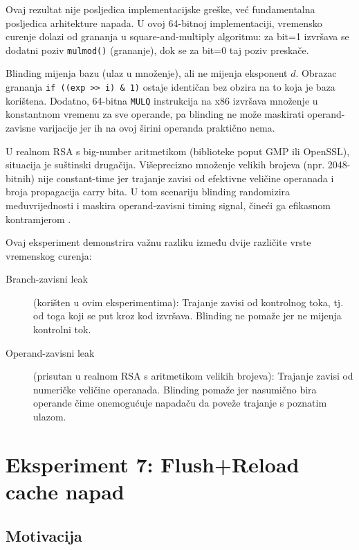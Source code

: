 Ovaj rezultat nije posljedica implementacijske greške, već fundamentalna posljedica arhitekture napada. U ovoj 64-bitnoj implementaciji, vremensko curenje dolazi od grananja u square-and-multiply algoritmu: za bit=1 izvršava se dodatni poziv \texttt{mulmod()} (grananje), dok se za bit=0 taj poziv preskače.

Blinding mijenja bazu (ulaz u množenje), ali ne mijenja eksponent $d$. Obrazac grananja \texttt{if ((exp >> i) \& 1)} ostaje identičan bez obzira na to koja je baza korištena. Dodatno, 64-bitna \texttt{MULQ} instrukcija na x86 izvršava množenje u konstantnom vremenu za sve operande, pa blinding ne može maskirati operand-zavisne varijacije jer ih na ovoj širini operanda praktično nema.

U realnom RSA s big-number aritmetikom (biblioteke poput GMP ili OpenSSL), situacija je suštinski drugačija. Višeprecizno množenje velikih brojeva (npr. 2048-bitnih) nije constant-time jer trajanje zavisi od efektivne veličine operanada i broja propagacija carry bita. U tom scenariju blinding randomizira međuvrijednosti i maskira operand-zavisni timing signal, čineći ga efikasnom kontramjerom \cite{brumley2003}.

Ovaj eksperiment demonstrira važnu razliku između dvije različite vrste vremenskog curenja:

\begin{description}
\item[Branch-zavisni leak] (korišten u ovim eksperimentima): Trajanje zavisi od kontrolnog toka, tj. od toga koji se put kroz kod izvršava. Blinding ne pomaže jer ne mijenja kontrolni tok.
\item[Operand-zavisni leak] (prisutan u realnom RSA s aritmetikom velikih brojeva): Trajanje zavisi od numeričke veličine operanada. Blinding pomaže jer nasumično bira operande čime onemogućuje napadaču da poveže trajanje s poznatim ulazom.
\end{description}


\section{Eksperiment 7: Flush+Reload cache napad}
\label{sec:fr_exp}

\subsection{Motivacija}


